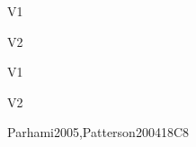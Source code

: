 \begin{syllabus}
\begin{outcomes}{V1}
    \item {}
    \item {}
    \item {}
\end{outcomes}

\begin{outcomes}{V2}
    \item {}
    \item {}
\end{outcomes}

\begin{competences}{V1}
    \item {} 
    \item {}
    \item {}
\end{competences}

\begin{competences}{V2}
    \item {} 
    \item {}
    \item {}
\end{competences}

\begin{unit}{\ARDigitallogicanddigitalsystems}{}{Parhami2005,Patterson2004}{18}{C8}
\begin{topics}%
    \item \ARDigitallogicanddigitalsystemsTopicOverview
    \item \ARDigitallogicanddigitalsystemsTopicCombinational
    \item \ARDigitallogicanddigitalsystemsTopicMultiple
    \item \ARDigitallogicanddigitalsystemsTopicComputer
    \item \ARDigitallogicanddigitalsystemsTopicRegister
    \item \ARDigitallogicanddigitalsystemsTopicPhysical
\end{topics}
\begin{learningoutcomes}
    \item \ARDigitallogicanddigitalsystemsLODescribeTheComputer [\Familiarity]
    \item \ARDigitallogicanddigitalsystemsLOComprehend [\Usage]
    \item \ARDigitallogicanddigitalsystemsLOExplainTheThe [\Usage]
    \item \ARDigitallogicanddigitalsystemsLOArticulate [\Familiarity]
    \item \ARDigitallogicanddigitalsystemsLODesignThe [\Usage]
    \item \ARDigitallogicanddigitalsystemsLOUseCad [\Familiarity]
    \item \ARDigitallogicanddigitalsystemsLOEvaluate [\Assessment]
\end{learningoutcomes}
\end{unit}


\end{syllabus}
